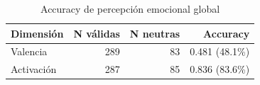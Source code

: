 \begin{table}[htbp]
\centering
\caption{Accuracy de percepción emocional global}
\label{tab:accuracy_overall}
\begin{tabular}{lrrr}
\toprule
\textbf{Dimensión} & \textbf{N válidas} & \textbf{N neutras} & \textbf{Accuracy} \\
\midrule
Valencia & 289 & 83 & 0.481 (48.1\%) \\
Activación & 287 & 85 & 0.836 (83.6\%) \\
\bottomrule
\end{tabular}
\end{table}
